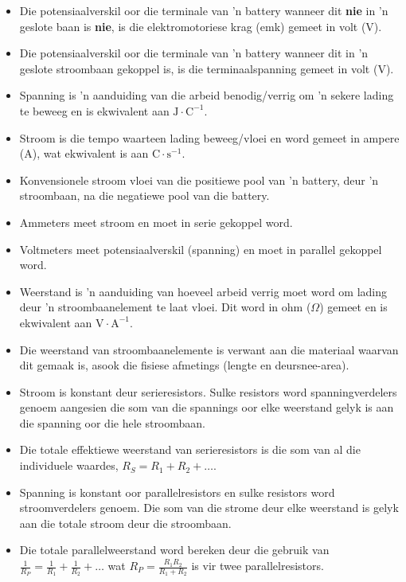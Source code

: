 \label{m38781*id201947}\begin{itemize}[noitemsep ] 
\item Die potensiaalverskil oor die terminale van 'n battery wanneer dit
\textbf{nie} in 'n geslote baan is \textbf{nie}, is die elektromotoriese krag
(emk) gemeet in volt (V).
\item Die potensiaalverskil oor die terminale van 'n battery wanneer dit in
 'n geslote stroombaan gekoppel is, is die terminaalspanning gemeet in volt (V).
\item Spanning is 'n aanduiding van die arbeid benodig/verrig om 'n sekere
lading te beweeg en is ekwivalent aan $\text{J}\cdot\text{C}^{-1}$.
\item Stroom is die tempo waarteen lading beweeg/vloei en word gemeet in ampere
(A), wat ekwivalent is aan $\text{C}\cdot\text{s}^{-1}$.
\item Konvensionele stroom vloei van die positiewe pool van 'n battery,
deur 'n stroombaan, na die negatiewe pool van die battery.
\item Ammeters meet stroom en moet in serie gekoppel word.
\item Voltmeters meet potensiaalverskil (spanning) en moet in parallel
gekoppel word.
\item Weerstand is 'n aanduiding van hoeveel arbeid verrig moet word om lading
deur 'n stroombaanelement te laat vloei. Dit word in ohm ($\Omega$) gemeet en
is ekwivalent aan  $\text{V}\cdot\text{A}^{-1}$.
\item Die weerstand van stroombaanelemente is verwant aan die materiaal waarvan
dit gemaak is, asook die fisiese afmetings (lengte en deursnee-area).
\item Stroom is konstant deur serieresistors. Sulke resistors word
spanningverdelers genoem aangesien die som van die spannings oor elke weerstand
gelyk is aan die spanning oor die hele stroombaan.
\item Die totale effektiewe weerstand van serieresistors is die som van al die
individuele waardes, $R_S=R_1+R_2+\ldots$.
\item Spanning is konstant oor parallelresistors en sulke resistors
word stroomverdelers genoem. Die som van die strome deur elke weerstand is
gelyk aan die totale stroom deur die stroombaan.
\item Die totale parallelweerstand word bereken deur die gebruik van 
$\frac{1}{R_P}=\frac{1}{R_1}+\frac{1}{R_2}+\ldots$ wat
$R_P=\frac{R_1R_2}{R_1+R_2}$ is vir twee parallelresistors.
\end{itemize}

